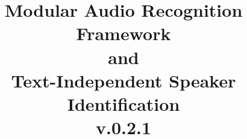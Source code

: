 \documentclass[letterpaper,11pt]{report}
\title{Modular Audio Recognition Framework\\and\\Text-Independent Speaker Identification\\v.0.2.1}
{\author{\bf {The MARF Development Group \hfill }\\\hline\\Represented by:\\\\Ian Cl\'ement\\Serguei A. Mokhov\\Dimitrios Nicolacopoulos\\Stephen Sinclair\\\\\\\\\\Montr\'eal, Qu\'ebec, Canada\\\\\\}}
\date{}
\begin{document}
	\begin{titlepage}
		\maketitle
	\end{titlepage}

	
	\clearpage

	
	\clearpage

	
	\clearpage

	
	\clearpage

	
	\clearpage

	
	\clearpage

	
	\clearpage

	
	\clearpage

	
	\clearpage

	
	\clearpage

	
	\clearpage
\end{document}
